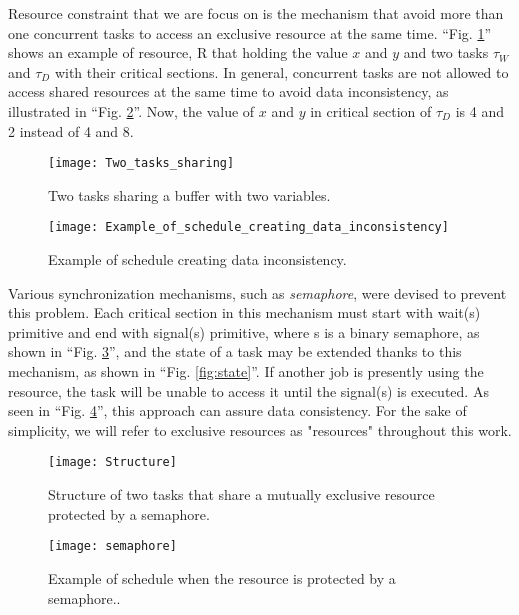 Resource constraint that we are focus on is the mechanism that avoid more than one concurrent tasks to access an exclusive resource at the same time. ``Fig. \ref{fig:Two_tasks_sharing}'' shows an example of resource, R that holding the value $x$ and $y$ and two tasks $\tau_{W}$ and $\tau_{D}$ with their critical sections. In general, concurrent tasks are not allowed to access shared resources at the same time to avoid data inconsistency, as illustrated in ``Fig. \ref{fig:Example_of_schedule_creating_data_inconsistency}''. Now, the value of $x$ and $y$ in critical section of $\tau_{D}$ is 4 and 2 instead of 4 and 8.

\begin{figure}[ht]
    \centering
    \texttt{[image: Two\_tasks\_sharing]}
    \caption{ Two tasks sharing a buffer with two variables. \cite{b5}}
    \label{fig:Two_tasks_sharing}
\end{figure}

\begin{figure}[ht]
    \centering
    \texttt{[image: Example\_of\_schedule\_creating\_data\_inconsistency]}
    \caption{Example of schedule creating data inconsistency. \cite{b5}}
    \label{fig:Example_of_schedule_creating_data_inconsistency}
\end{figure}

Various synchronization mechanisms, such as \textit{semaphore}, were devised to prevent this problem. Each critical section in this mechanism must start with wait(s) primitive and end with signal(s) primitive, where s is a binary semaphore, as shown in ``Fig. \ref{fig:Structure}'', and the state of a task may be extended thanks to this mechanism, as shown in ``Fig. \ref{fig:state}''. If another job is presently using the resource, the task will be unable to access it until the signal(s) is executed. As seen in ``Fig. \ref{fig:semaphore}'', this approach can assure data consistency. For the sake of simplicity, we will refer to exclusive resources as "resources" throughout this work.

\begin{figure}[ht]
    \centering
    \texttt{[image: Structure]}
    \caption{Structure of two tasks that share a mutually exclusive resource protected by
a semaphore. \cite{b5}}
    \label{fig:Structure}
\end{figure}


\begin{figure}[ht]
    \centering
    \texttt{[image: semaphore]}
    \caption{Example of schedule when the resource is protected by a semaphore.. \cite{b5}}
    \label{fig:semaphore}
\end{figure}

